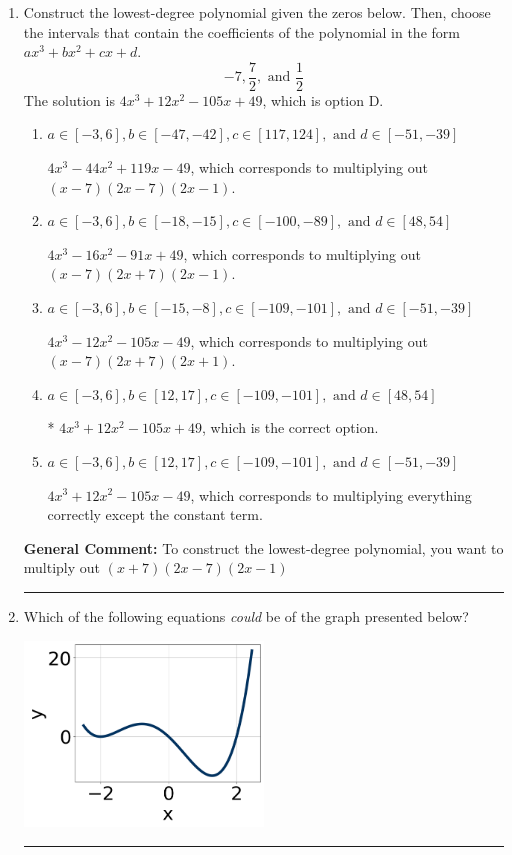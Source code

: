 \documentclass{extbook}[14pt]
\newcommand{\litem}[1]{\item #1

\rule{\textwidth}{0.4pt}}
\begin{document}
\begin{enumerate}\litem{
Construct the lowest-degree polynomial given the zeros below. Then, choose the intervals that contain the coefficients of the polynomial in the form $ax^3+bx^2+cx+d$.
\[ -7, \frac{7}{2}, \text{ and } \frac{1}{2} \]The solution is \( 4x^{3} +12 x^{2} -105 x + 49 \), which is option D.\begin{enumerate}[label=\Alph*.]
\item \( a \in [-3, 6], b \in [-47, -42], c \in [117, 124], \text{ and } d \in [-51, -39] \)

$4x^{3} -44 x^{2} +119 x -49$, which corresponds to multiplying out $(x -7)(2x -7)(2x -1)$.
\item \( a \in [-3, 6], b \in [-18, -15], c \in [-100, -89], \text{ and } d \in [48, 54] \)

$4x^{3} -16 x^{2} -91 x + 49$, which corresponds to multiplying out $(x -7)(2x + 7)(2x -1)$.
\item \( a \in [-3, 6], b \in [-15, -8], c \in [-109, -101], \text{ and } d \in [-51, -39] \)

$4x^{3} -12 x^{2} -105 x -49$, which corresponds to multiplying out $(x -7)(2x + 7)(2x + 1)$.
\item \( a \in [-3, 6], b \in [12, 17], c \in [-109, -101], \text{ and } d \in [48, 54] \)

* $4x^{3} +12 x^{2} -105 x + 49$, which is the correct option.
\item \( a \in [-3, 6], b \in [12, 17], c \in [-109, -101], \text{ and } d \in [-51, -39] \)

$4x^{3} +12 x^{2} -105 x -49$, which corresponds to multiplying everything correctly except the constant term.
\end{enumerate}

\textbf{General Comment:} To construct the lowest-degree polynomial, you want to multiply out $(x + 7)(2x -7)(2x -1)$
}
\litem{
Which of the following equations \textit{could} be of the graph presented below?

\begin{center}
    \includegraphics[width=0.5\textwidth]{../Figures/polyGraphToFunctionA.png}
\end{center}


}
\end{enumerate}
\end{document}
